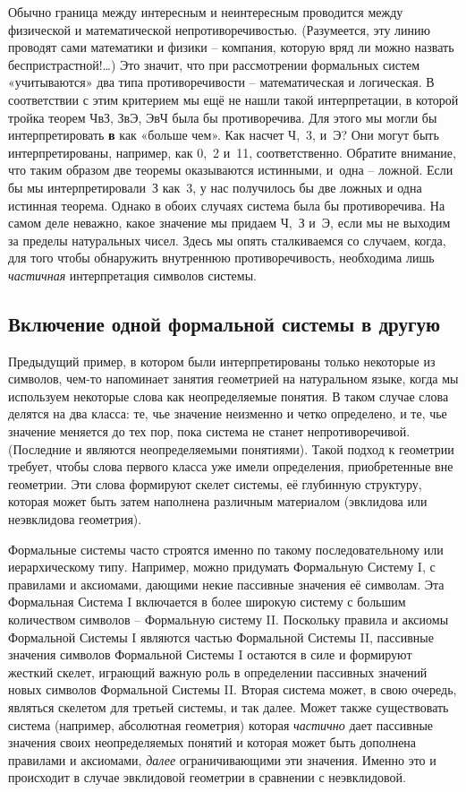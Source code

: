 \documentclass[../main.tex]{subfiles}
\begin{document}
Обычно граница между интересным и неинтересным проводится между физической и математической непротиворечивостью. (Разумеется, эту линию проводят сами математики и физики \--- компания, которую вряд ли можно назвать беспристрастной!\ldots) Это значит, что при рассмотрении формальных систем «учитываются» два типа противоречивости \--- математическая и логическая. В соответствии с этим критерием мы ещё не нашли такой интерпретации, в которой тройка теорем ЧвЗ, ЗвЭ, ЭвЧ была бы противоречива. Для этого мы могли бы интерпретировать \textbf{в} как «больше чем». Как насчет Ч,~3, и~Э? Они могут быть интерпретированы, например, как 0,~2 и~11, соответственно. Обратите внимание, что таким образом две теоремы оказываются истинными, и~одна \--- ложной. Если бы мы интерпретировали~З как~3, у нас получилось бы две ложных и одна истинная теорема. Однако в обоих случаях система была бы противоречива. На самом деле неважно, какое значение мы придаем Ч,~З и~Э, если мы не выходим за пределы натуральных чисел. Здесь мы опять сталкиваемся со случаем, когда, для того чтобы обнаружить внутреннюю противоречивость, необходима лишь \emph{частичная} интерпретация символов системы.


\subsection{Включение одной формальной системы в другую}

Предыдущий пример, в котором были интерпретированы только некоторые из символов, чем-то напоминает занятия геометрией на натуральном языке, когда мы используем некоторые слова как неопределяемые понятия. В таком случае слова делятся на два класса: те, чье значение неизменно и четко определено, и те, чье значение меняется до тех пор, пока система не станет непротиворечивой.(Последние и являются неопределяемыми понятиями). Такой подход к геометрии требует, чтобы слова первого класса уже имели определения, приобретенные вне геометрии. Эти слова формируют скелет системы, её глубинную структуру, которая может быть затем наполнена различным материалом (эвклидова или неэвклидова геометрия).

Формальные системы часто строятся именно по такому последовательному или иерархическому типу. Например, можно придумать Формальную Систему I, с правилами и аксиомами, дающими некие пассивные значения её символам. Эта Формальная Система I включается в более широкую систему с большим количеством символов \--- Формальную систему II. Поскольку правила и аксиомы Формальной Системы I являются частью Формальной Системы II, пассивные значения символов Формальной Системы I остаются в силе и формируют жесткий скелет, играющий важную роль в определении пассивных значений новых символов Формальной Системы II. Вторая система может, в свою очередь, являться скелетом для третьей системы, и так далее. Может также существовать система (например, абсолютная геометрия) которая \emph{частично} дает пассивные значения своих неопределяемых понятий и которая может быть дополнена правилами и аксиомами, \emph{далее} ограничивающими эти значения. Именно это и происходит в случае эвклидовой геометрии в сравнении с неэвклидовой.
\end{document}
